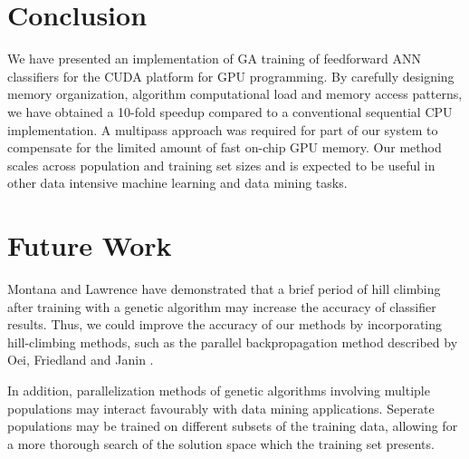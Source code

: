 \documentclass[11pt]{article}       %
\begin{document}
\section{Conclusion} \label{concl}
We have presented an implementation of GA training of feedforward ANN classifiers for the CUDA platform for GPU programming. By carefully designing memory organization, algorithm computational load and memory access patterns, we have obtained a 10-fold speedup compared to a conventional sequential CPU implementation. A multipass approach was required for part of our system to compensate for the limited amount of fast on-chip GPU memory. Our method scales across population and training set sizes and is expected to be useful in other data intensive machine learning and data mining tasks.

\section{Future Work} \label{future}
Montana and Lawrence \cite{GA-ANN} have demonstrated that a brief period of hill climbing after training with a genetic algorithm may increase the accuracy of classifier results. Thus, we could improve the accuracy of our methods by incorporating hill-climbing methods, such as the parallel backpropagation method described by Oei, Friedland and Janin \cite{backprop}.

In addition, parallelization methods of genetic algorithms involving multiple populations \cite{Alba1999} may interact favourably with data mining applications.  Seperate populations may be trained on different subsets of the training data, allowing for a more thorough search of the solution space which the training set presents.



\end{document}
